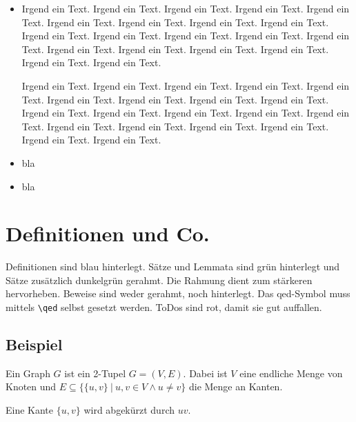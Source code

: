 \begin{itemize}
	\item Irgend ein Text. Irgend ein Text. Irgend ein Text. Irgend ein Text. Irgend ein Text. Irgend ein Text. Irgend ein Text. Irgend ein Text. Irgend ein Text. Irgend ein Text. Irgend ein Text. Irgend ein Text. Irgend ein Text. Irgend ein Text. Irgend ein Text. Irgend ein Text. Irgend ein Text. Irgend ein Text. Irgend ein Text. Irgend ein Text.
	
	Irgend ein Text. Irgend ein Text. Irgend ein Text. Irgend ein Text. Irgend ein Text. Irgend ein Text. Irgend ein Text. Irgend ein Text. Irgend ein Text. Irgend ein Text. Irgend ein Text. Irgend ein Text. Irgend ein Text. Irgend ein Text. Irgend ein Text. Irgend ein Text. Irgend ein Text. Irgend ein Text. Irgend ein Text. Irgend ein Text.
	
	\item bla
	\item bla
\end{itemize}


\section{Definitionen und Co.}
Definitionen sind blau hinterlegt.
Sätze und Lemmata sind grün hinterlegt und Sätze zusätzlich dunkelgrün gerahmt.
Die Rahmung dient zum stärkeren hervorheben.
Beweise sind weder gerahmt, noch hinterlegt. Das qed-Symbol muss mittels \texttt{\small\textbackslash qed} selbst gesetzt werden.
ToDos sind rot, damit sie gut auffallen.

%
%
\subsection{Beispiel}
\begin{mydef}[Graph]Ein Graph $G$ ist ein 2-Tupel $G=(V,E)$. Dabei ist
 $V$ eine endliche Menge von Knoten und
 $E \subseteq \{\{u,v\} \ |\ u,v \in V \wedge u \neq v\}$ die Menge an Kanten.

Eine Kante $\{u,v\}$ wird abgekürzt durch $uv$.
\end{mydef}

